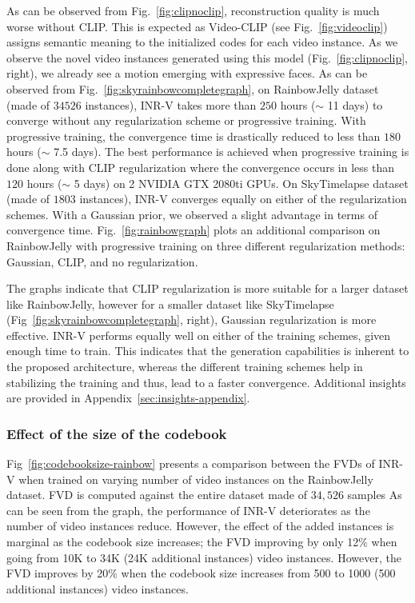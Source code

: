 \documentclass[10pt]{article} \usepackage[accepted]{tmlr}
\begin{document}
As can be observed from Fig.~\ref{fig:clipnoclip}, reconstruction quality is much worse without CLIP. This is expected as Video-CLIP (see Fig.~\ref{fig:videoclip}) assigns semantic meaning to the initialized codes for each video instance. As we observe the 
novel video instances generated using this model (Fig.~\ref{fig:clipnoclip}, right), we already see a motion emerging with expressive faces. 
As can be observed from Fig.~\ref{fig:skyrainbowcompletegraph}, on RainbowJelly dataset (made of $34526$ instances), INR-V takes more than $250$ hours ($\sim$ 11 days) to converge without any regularization scheme or progressive training. With progressive training, the convergence time is drastically reduced to less than $180$ hours ($\sim$ 7.5 days). The best performance is achieved when progressive training is done along with CLIP regularization where the convergence occurs in less than $120$ hours ($\sim$ 5 days) on 2 NVIDIA GTX 2080ti GPUs. On SkyTimelapse dataset (made of $1803$ instances), INR-V converges equally on either of the regularization schemes. With a Gaussian prior, we observed a slight advantage in terms of convergence time. Fig.~\ref{fig:rainbowgraph} plots an additional comparison on RainbowJelly with progressive training on three different regularization methods: Gaussian, CLIP, and no regularization.

The graphs indicate that CLIP regularization is more suitable for a larger dataset like RainbowJelly, however for a smaller dataset like SkyTimelapse (Fig~\ref{fig:skyrainbowcompletegraph}, right), Gaussian regularization is more effective. 
INR-V performs equally well on either of the training schemes, given enough time to train. This indicates that the generation capabilities is inherent to the proposed architecture, whereas the different training schemes help in stabilizing the training and thus, lead to a faster convergence. Additional insights are provided in Appendix~\ref{sec:insights-appendix}.

\subsubsection{Effect of the size of the codebook}

Fig~\ref{fig:codebooksize-rainbow} presents a comparison between the FVDs of INR-V when trained on varying number of video instances on the RainbowJelly dataset. FVD is computed against the entire dataset made of $34,526$ samples
As can be seen from the graph, the performance of INR-V deteriorates as the number of video instances reduce. However, the effect of the added instances is marginal as the codebook size increases; the FVD improving by only 12\% when going from 10K to 34K (24K additional instances) video instances. However, the FVD improves by 20\% when the codebook size increases from 500 to 1000 (500 additional instances) video instances.
\end{document}
